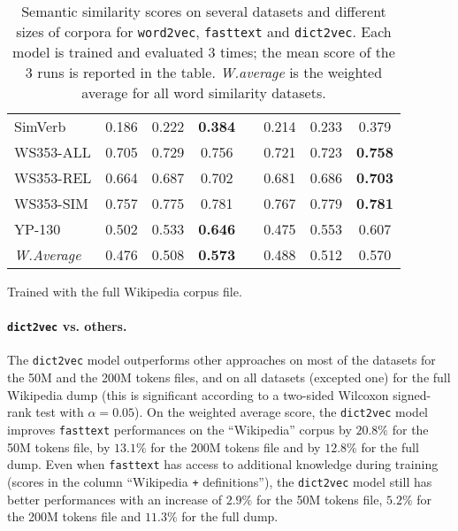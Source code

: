 \begin{table}
\begin{subtable}{\textwidth}
{\begin{tabular}{@{}lccccccc@{}}
            SimVerb            & 0.186 & 0.222 & \bf{0.384} &
                               & 0.214 & 0.233 & 0.379 \\
            WS353-ALL          & 0.705 & 0.729 & 0.756 &
                               & 0.721 & 0.723 & \bf{0.758} \\
            WS353-REL          & 0.664 & 0.687 & 0.702 &
                               & 0.681 & 0.686 & \bf{0.703} \\
            WS353-SIM          & 0.757 & 0.775 & 0.781 &
                               & 0.767 & 0.779 & \bf{0.781} \\
            YP-130             & 0.502 & 0.533 & \bf{0.646} &
                               & 0.475 & 0.553 & 0.607 \\
            \cmidrule{2-8}
            \textit{W.Average} & 0.476 & 0.508 & \bf{0.573} &
                               & 0.488 & 0.512 & 0.570 \\
          \bottomrule[0.1em]
        \end{tabular}}
        \caption{Trained with the full Wikipedia corpus file.}
      \end{subtable}
      \caption[Evaluation of \texttt{dict2vec} and other models on a semantic
      similarity task.]{Semantic similarity scores on several datasets and
      different sizes of corpora for \texttt{word2vec}, \texttt{fasttext} and
      \texttt{dict2vec}. Each model is trained and evaluated 3 times; the mean
      score of the 3 runs is reported in the table. \textit{W.average} is the
      weighted average for all word similarity datasets.}
      \label{ch05:tab:results-semantic}
    \end{table}

    \paragraph{\texttt{dict2vec} vs. others.}
      The \texttt{dict2vec} model outperforms other approaches on most of the
      datasets for the 50M and the 200M tokens files, and on all datasets
      (excepted one) for the full Wikipedia dump (this is significant according
      to a two-sided Wilcoxon signed-rank test with $\alpha=0.05$). On the
      weighted average score, the \texttt{dict2vec} model improves
      \texttt{fasttext} performances on the ``Wikipedia'' corpus by $20.8\%$ for
      the 50M tokens file, by $13.1\%$ for the 200M tokens file and by $12.8\%$
      for the full dump. Even when \texttt{fasttext} has access to additional
      knowledge during training (scores in the column ``Wikipedia \texttt{+}
      definitions''), the \texttt{dict2vec} model still has better performances
      with an increase of $2.9\%$ for the 50M tokens file, $5.2\%$ for the 200M
      tokens file and $11.3\%$ for the full dump.

